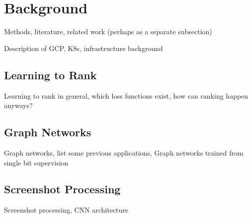 \section{Background}

Methods, literature, related work (perhaps as a separate subsection)

Description of GCP, K8s, infrastructure background

\subsection{Learning to Rank}
Learning to rank in general, which loss functions exist, how can ranking happen anyways?

\subsection{Graph Networks}
Graph networks, list some previous applications, Graph networks trained from single bit supervision

\subsection{Screenshot Processing}
Screenshot processing, CNN architecture
